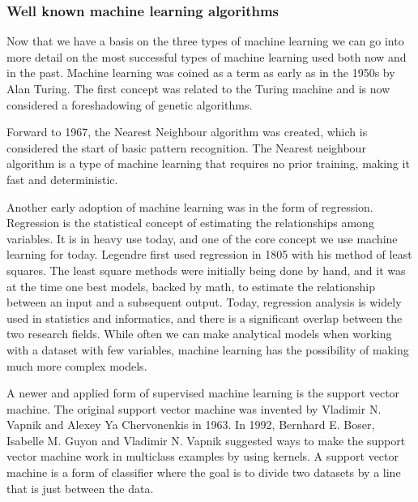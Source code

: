 \subsubsection{Well known machine learning algorithms}
Now that we have a basis on the three types of machine learning we can go into more detail on the most successful types of machine learning used both now and in the past. 
Machine learning was coined as a term as early as in the 1950s by Alan Turing. The first concept was related to the Turing machine and is now considered a foreshadowing of genetic algorithms.~\cite{10.1093/mind/LIX.236.433}

\vspace{5px}

Forward to 1967, the Nearest Neighbour algorithm\cite{Cover:2006:NNP:2263261.2267456} was created, which is considered the start of basic pattern recognition. The Nearest neighbour algorithm is a type of machine learning that requires no prior training, making it fast and deterministic.

\vspace{5px}

Another early adoption of machine learning was in the form of regression. Regression is the statistical concept of estimating the relationships among variables. It is in heavy use today, and one of the core concept we use machine learning for today. 
Legendre first used regression in 1805 with his method of least squares. The least square methods were initially being done by hand, and it was at the time one best models, backed by math, to estimate the relationship between an input and a subsequent output. 
Today, regression analysis is widely used in statistics and informatics, and there is a significant overlap between the two research fields. While often we can make analytical models when working with a dataset with few variables, machine learning has the possibility of making much more complex models.

\vspace{5px}

A newer and applied form of supervised machine learning is the support vector machine. The original support vector machine was invented by Vladimir N. Vapnik and Alexey Ya Chervonenkis in 1963.  
In 1992, Bernhard E. Boser, Isabelle M. Guyon and Vladimir N. Vapnik suggested ways to make the support vector machine work in multiclass examples by using kernels.  
A support vector machine is a form of classifier where the goal is to divide two datasets by a line that is just between the data. 

